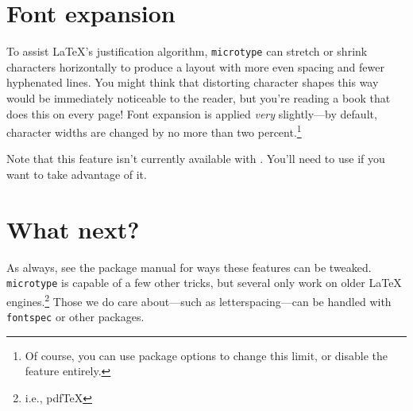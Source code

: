 \section{Font expansion}

To assist \LaTeX's justification algorithm,
\texttt{microtype} can
stretch or shrink characters horizontally to produce a layout
with more even spacing and fewer hyphenated lines.
You might think that distorting character shapes this way would be immediately
noticeable to the reader,
but you're reading a book that does this on every page!
Font expansion is applied \emph{very} slightly---by default,
character widths are changed by no more than two percent.\punckern\footnote{%
Of course, you can use package options to change this limit,
or disable the feature entirely.}

Note that this feature isn't currently available with \XeLaTeX{}.
You'll need to use \LuaLaTeX{} if you want to take advantage of it.

\section{What next?}

As always, see the package manual for ways these features can be tweaked.
\texttt{microtype} is capable of a few other tricks,
but several only work on older \LaTeX{} engines.\punckern\footnote{i.e., pdf\TeX}
Those we do care about---such as letterspacing---can be handled with
\texttt{fontspec} or other packages.
